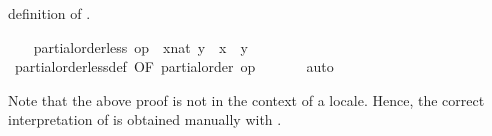 \begin{isabellebody}
\begin{isamarkuptxt}
    definition of .%
\end{isamarkuptxt}%
\isamarkuptrue%
\ \ \isamarkupfalse%
\ {\isachardoublequoteopen}partial{\isacharunderscore}order{\isachardot}less\ op\ {\isasymle}\ {\isacharparenleft}x{\isacharcolon}{\isacharcolon}nat{\isacharparenright}\ y\ {\isacharequal}\ {\isacharparenleft}x\ {\isacharless}\ y{\isacharparenright}{\isachardoublequoteclose}\isanewline
\ \ \ \ \isamarkupfalse%
\ partial{\isacharunderscore}order{\isachardot}less{\isacharunderscore}def\ {\isacharbrackleft}OF\ {\isacharbackquoteopen}partial{\isacharunderscore}order\ op\ {\isasymle}{\isacharbackquoteclose}{\isacharbrackright}\isanewline
\ \ \ \ \isamarkupfalse%
\ auto\isanewline
{}\isamarkupfalse%
%
\endisatagvisible
{\isafoldvisible}%
%
\isadelimvisible
%
\endisadelimvisible
%
\begin{isamarkuptext}%
Note that the above proof is not in the context of a locale.
  Hence, the correct interpretation of  is obtained manually with .%
\end{isamarkuptext}%
\isamarkuptrue%
%
\isadelimtheory
%
\endisadelimtheory
%
\isatagtheory
{}\isamarkupfalse%
%
\endisatagtheory
{\isafoldtheory}%
%
\isadelimtheory
%
\endisadelimtheory
\isanewline
\end{isabellebody}%
